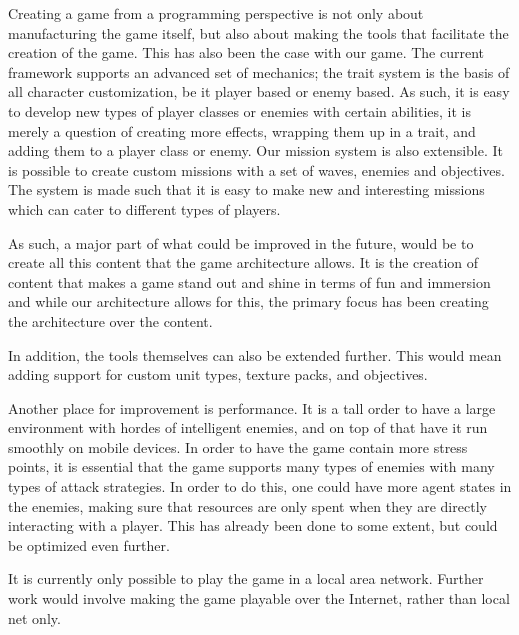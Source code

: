 Creating a game from a programming perspective is not only about manufacturing the game itself, but also about making the tools that facilitate the creation of the game.
This has also been the case with our game.
The current framework supports an advanced set of mechanics; the trait system is the basis of all character customization, be it player based or enemy based.
As such, it is easy to develop new types of player classes or enemies with certain abilities, it is merely a question of creating more effects, wrapping them up in a trait, and adding them to a player class or enemy.
Our mission system is also extensible.
It is possible to create custom missions with a set of waves, enemies and objectives.
The system is made such that it is easy to make new and interesting missions which can cater to different types of players. 

As such, a major part of what could be improved in the future, would be to create all this content that the game architecture allows.
It is the creation of content that makes a game stand out and shine in terms of fun and immersion and while our architecture allows for this, the primary focus has been creating the architecture over the content. 

In addition, the tools themselves can also be extended further.
This would mean adding support for custom unit types, texture packs, and objectives.

Another place for improvement is performance.
It is a tall order to have a large environment with hordes of intelligent enemies, and on top of that have it run smoothly on mobile devices.
In order to have the game contain more stress points, it is essential that the game supports many types of enemies with many types of attack strategies.
In order to do this, one could have more agent states in the enemies, making sure that resources are only spent when they are directly interacting with a player.
This has already been done to some extent, but could be optimized even further.

It is currently only possible to play the game in a local area network.
Further work would involve making the game playable over the Internet, rather than local net only.
